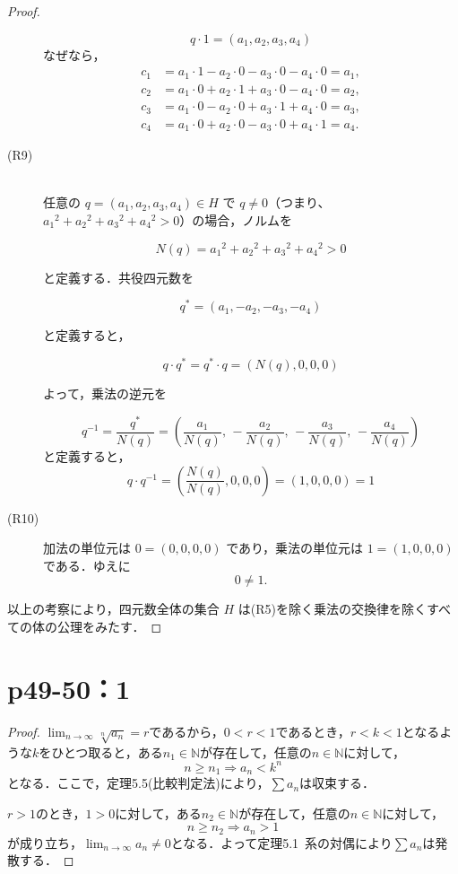 \documentclass[a4paper,10pt,fleqn]{ltjsarticle}
\begin{document}
\begin{leftbar}
\begin{proof}
\begin{description}
\[
q \cdot 1 = (a_1, a_2, a_3, a_4)
\]
なぜなら，
\begin{align*}
c_1 &= a_1 \cdot 1 - a_2 \cdot 0 - a_3 \cdot 0 - a_4 \cdot 0 = a_1, \\
c_2 &= a_1 \cdot 0 + a_2 \cdot 1 + a_3 \cdot 0 - a_4 \cdot 0 = a_2, \\
c_3 &= a_1 \cdot 0 - a_2 \cdot 0 + a_3 \cdot 1 + a_4 \cdot 0 = a_3, \\
c_4 &= a_1 \cdot 0 + a_2 \cdot 0 - a_3 \cdot 0 + a_4 \cdot 1 = a_4.
\end{align*}
\item [(R9)] \mbox{} \\
任意の $q = (a_1, a_2, a_3, a_4) \in H$ で $q \ne 0$（つまり、${a_1}^2 + {a_2}^2 + {a_3}^2 + {a_4}^2 > 0$）の場合，ノルムを

\[
N(q) = {a_1}^2 + {a_2}^2 + {a_3}^2 + {a_4}^2 > 0
\]

と定義する．共役四元数を

\[
q^* = (a_1, -a_2, -a_3, -a_4)
\]

と定義すると，

\[
q \cdot q^* = q^* \cdot q = (N(q), 0, 0, 0)
\]

よって，乗法の逆元を

\[
q^{-1} = \frac{q^*}{N(q)} = \left( \frac{a_1}{N(q)},\, -\frac{a_2}{N(q)},\, -\frac{a_3}{N(q)},\, -\frac{a_4}{N(q)} \right)
\]
と定義すると，
\[
q \cdot q^{-1} = \left( \frac{N(q)}{N(q)}, 0, 0, 0 \right) = (1, 0, 0, 0) = 1
\]
\item [(R10)]
加法の単位元は $0 = (0, 0, 0, 0)$ であり，乗法の単位元は $1 = (1, 0, 0, 0)$ である．ゆえに
\[
0 \ne 1.
\]
\end{description}
以上の考察により，四元数全体の集合 $H$ は(R5)を除く乗法の交換律を除くすべての体の公理をみたす．
\end{proof}
\end{leftbar}
\newpage 

    \section*{p49-50：1}

\begin{tleftbar}
	\begin{proof}
		$\lim_{n \to \infty} \sqrt[n]{a_n} =r$であるから，$0<r<1$であるとき，$r<k<1$となるような$k$をひとつ取ると，ある$n_1 \in \mathbb{N}$が存在して，任意の$n \in \mathbb{N}$に対して，
		\[
			n \ge n_1 \Longrightarrow a_n<k^n
		\]
		となる．ここで，定理5.5(比較判定法)により，$\sum a_n$は収束する．

		$r>1$のとき，$1>0$に対して，ある$n_2 \in \mathbb{N}$が存在して，任意の$n \in \mathbb{N}$に対して，
		\[
			n \ge n_2 \Longrightarrow a_n >1
		\]
		が成り立ち，$\lim_{n \to \infty} a_n \ne 0$となる．よって定理5.1~系の対偶により$\sum a_n$は発散する．
	\end{proof}
\end{tleftbar}
\end{document}
